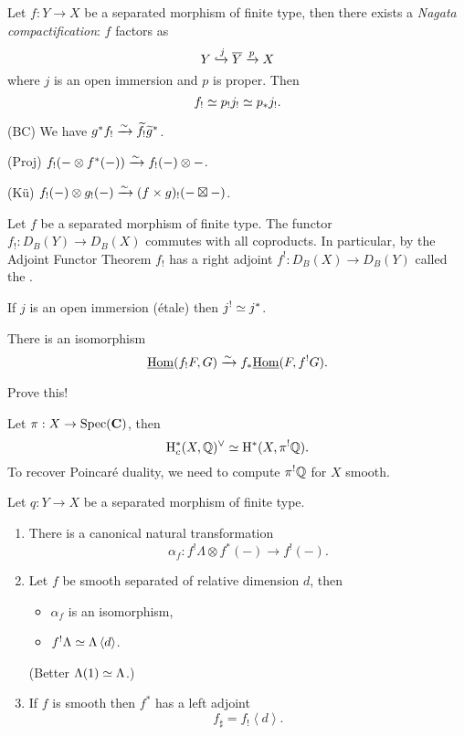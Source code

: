Let $f:Y\to X$ be a separated morphism of finite type, then there exists a \textit{Nagata
compactification}: $f$ factors as
\[
Y \xhookrightarrow{j} \overline{Y} \xrightarrow{p} X
\]
where $j$ is an open immersion and $p$ is proper. Then
\[
f_! \simeq p_!j_! \simeq p_*j_!.
\]
\begin{theorem}
(BC) We have $g^{*}f_! \xrightarrow{\sim} \widetilde{f}_!\widetilde{g}^{*}$.

(Proj) $f_!(-\otimes f^{*}(-)) \xrightarrow{\sim} f_!(-)\otimes -$.

(K\"u) $f_!(-)\otimes g_!(-) \xrightarrow{\sim} (f\times g)_!(-\boxtimes -)$.
\end{theorem}
\begin{proposition}
Let $f$ be a separated morphism of finite type. The functor $f_!:D_B(Y)\to D_B(X)$
commutes with all coproducts. In particular, by the Adjoint Functor Theorem $f_!$ has a right
adjoint $f^!:D_B(X)\to D_B(Y)$ called the .
\end{proposition}
\begin{example}
If $j$ is an open immersion (\'etale) then $j^{!}\simeq j^{*}$.
\end{example}
\begin{proposition}
There is an isomorphism
\[
\underline{\operatorname{Hom}}(f_!F,G) \xrightarrow{\sim} f_*\underline{\operatorname{Hom}}(F,f^{!}G).
\] 	
\end{proposition}
\begin{exercise}
Prove this!	
\end{exercise}
\begin{example}
Let $\pi:X\to \Spec(\bb{C})$, then
\[
\mathrm{H}_c^{*}(X,\mathbb Q)^{\vee} \simeq \mathrm{H}^{*}(X,\pi^{!}\mathbb Q).
\]
To recover Poincar\'e duality, we need to compute $\pi^{!}\mathbb Q$ for $X$ smooth.
\end{example}
\begin{theorem}
Let $q:Y\to X$ be a separated morphism of finite type.
\begin{enumerate}[1)]
\item There is a canonical natural transformation
\[
\alpha_f:f^{!}\Lambda\otimes f^{*}(-) \to f^{!}(-).
\]
\item Let $f$ be smooth separated of relative dimension $d$, then
\begin{itemize}
\item $\alpha_f$ is an isomorphism,
\item $f^{!}\Lambda\simeq \Lambda\left<d \right>$.
\end{itemize}
(Better $\Lambda(1)\simeq\Lambda$.)
\item If $f$ is smooth then $f^{*}$ has a left adjoint
\[
f_\sharp = f_!\left<d \right>.
\]
\end{enumerate}
\end{theorem}
